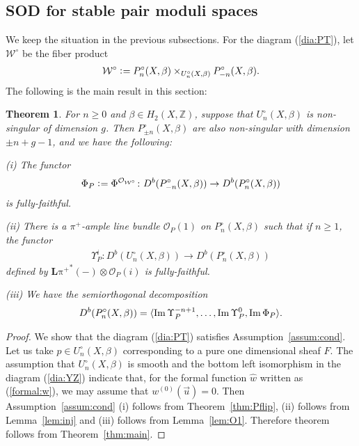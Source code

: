 \documentclass[11pt]{amsart}
\theoremstyle{plain}
\newtheorem{thm}{Theorem}[section]
\newcommand{\oO}{\mathcal{O}}
\newcommand{\wW}{\mathcal{W}}
\newcommand{\dL}{\mathbf{L}}
\newcommand{\Imm}{\mathop{\rm Im}\nolimits}
\begin{document}
\subsection{SOD for stable pair moduli spaces}
We keep the situation in the previous 
subsections. For the diagram (\ref{dia:PT}), let 
$\wW^{\circ}$ be the fiber product
\begin{align*}
\wW^{\circ} \cneq P_n^{\circ}(X, \beta)
 \times_{U_n^{\circ}(X, \beta)}P_{-n}^{\circ}(X, \beta).
\end{align*}
The following is the main result in this section:
\begin{thm}\label{thm:PTpair}
For $n\ge 0$ and $\beta \in H_2(X, \mathbb{Z})$, 
suppose that $U_n^{\circ}(X, \beta)$
is non-singular of dimension $g$. 
Then $P_{\pm n}^{\circ}(X, \beta)$ are also 
non-singular with dimension $\pm n+g-1$, 
and we have the following: 

(i) The functor
\begin{align*}
\Phi_P \cneq 
\Phi^{\oO_{\wW^{\circ}}} 
 \colon D^b(P_{-n}^{\circ}(X, \beta)) \to D^b(P_n^{\circ}(X, \beta))
\end{align*}
is fully-faithful. 

(ii) There is a $\pi^{+}$-ample line bundle 
$\oO_P(1)$ on $P_n^{\circ}(X, \beta)$ such that
if $n\ge 1$, the functor
\begin{align*}
\Upsilon^i_P \colon D^b(U_n^{\circ}(X, \beta)) \to D^b(P_n^{\circ}(X, \beta))
\end{align*}
defined by $\dL\mathrm{\pi^+}^{\ast}(-) \otimes \oO_P(i)$ is
 fully-faithful. 

(iii) We have the semiorthogonal decomposition
\begin{align*}
D^b(P_n^{\circ}(X, \beta))=
\langle \Imm \Upsilon_P^{-n+1}, \ldots, \Imm \Upsilon_P^{0}, \Imm \Phi_P
 \rangle.
\end{align*}
\end{thm}
\begin{proof}
We show that the diagram (\ref{dia:PT}) satisfies 
Assumption~\ref{assum:cond}. 
Let us take $p \in U_n^{\circ}(X, \beta)$
corresponding to a pure one dimensional sheaf $F$. 
The assumption that $U_n^{\circ}(X, \beta)$ is smooth and the
bottom left isomorphism in the diagram 
(\ref{dia:YZ}) indicate that, for 
the formal function $\widehat{w}$
written as (\ref{formal:w}), we 
may assume that $w^{(0)}(\vec{u})=0$. 
Then
Assumption~\ref{assum:cond} (i) follows 
from Theorem~\ref{thm:Pflip}, (ii) 
follows from Lemma~\ref{lem:inj} and (iii)
follows from Lemma~\ref{lem:O1}. 
Therefore theorem follows from Theorem~\ref{thm:main}. 
\end{proof}
\end{document}
